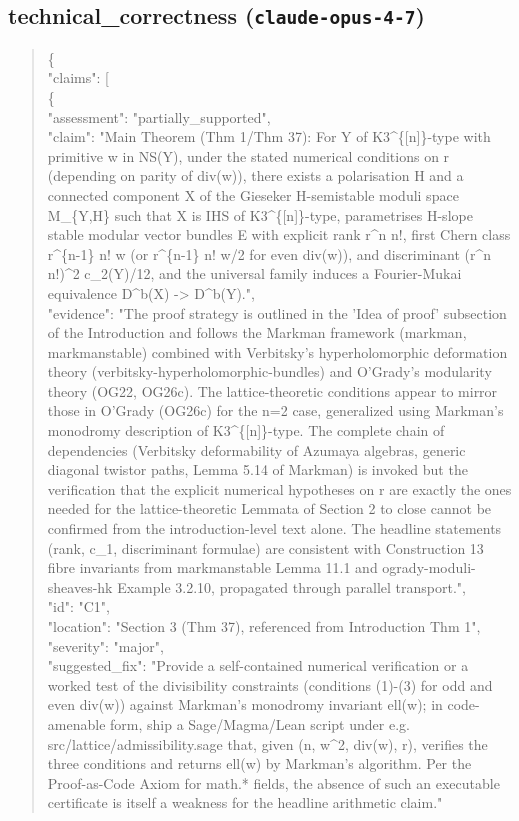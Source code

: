 \documentclass[11pt]{article}
\begin{document}
\subsection*{technical\_correctness (\texttt{claude-opus-4-7})}
\begin{quote}\small\ttfamily\raggedright
\{\\
  "claims": [\\
    \{\\
      "assessment": "partially\_supported",\\
      "claim": "Main Theorem (Thm 1/Thm 37): For Y of K3\^{}\{[n]\}-type with primitive w in NS(Y), under the stated numerical conditions on r (depending on parity of div(w)), there exists a polarisation H and a connected component X of the Gieseker H-semistable moduli space M\_\{Y,H\} such that X is IHS of K3\^{}\{[n]\}-type, parametrises H-slope stable modular vector bundles E with explicit rank r\^{}n n!, first Chern class r\^{}\{n-1\} n! w (or r\^{}\{n-1\} n! w/2 for even div(w)), and discriminant (r\^{}n n!)\^{}2 c\_2(Y)/12, and the universal family induces a Fourier-Mukai equivalence D\^{}b(X) -> D\^{}b(Y).",\\
      "evidence": "The proof strategy is outlined in the 'Idea of proof' subsection of the Introduction and follows the Markman framework (markman, markmanstable) combined with Verbitsky's hyperholomorphic deformation theory (verbitsky-hyperholomorphic-bundles) and O'Grady's modularity theory (OG22, OG26c). The lattice-theoretic conditions appear to mirror those in O'Grady (OG26c) for the n=2 case, generalized using Markman's monodromy description of K3\^{}\{[n]\}-type. The complete chain of dependencies (Verbitsky deformability of Azumaya algebras, generic diagonal twistor paths, Lemma 5.14 of Markman) is invoked but the verification that the explicit numerical hypotheses on r are exactly the ones needed for the lattice-theoretic Lemmata of Section 2 to close cannot be confirmed from the introduction-level text alone. The headline statements (rank, c\_1, discriminant formulae) are consistent with Construction 13 fibre invariants from markmanstable Lemma 11.1 and ogrady-moduli-sheaves-hk Example 3.2.10, propagated through parallel transport.",\\
      "id": "C1",\\
      "location": "Section 3 (Thm 37), referenced from Introduction Thm 1",\\
      "severity": "major",\\
      "suggested\_fix": "Provide a self-contained numerical verification or a worked test of the divisibility constraints (conditions (1)-(3) for odd and even div(w)) against Markman's monodromy invariant ell(w); in code-amenable form, ship a Sage/Magma/Lean script under e.g. src/lattice/admissibility.sage that, given (n, w\^{}2, div(w), r), verifies the three conditions and returns ell(w) by Markman's algorithm. Per the Proof-as-Code Axiom for math.* fields, the absence of such an executable certificate is itself a weakness for the headline arithmetic claim."\\

\end{quote}
\end{document}
